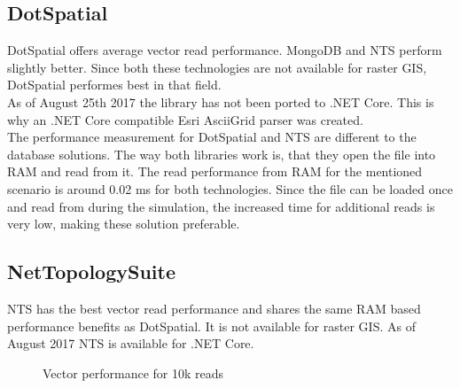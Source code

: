 \subsection{DotSpatial}
DotSpatial offers average vector read performance. MongoDB and NTS perform slightly better. Since both these technologies are not available for raster GIS, DotSpatial performes best in that field.\\
As of August 25th 2017 the library has not been ported to .NET Core. This is why an .NET Core compatible Esri AsciiGrid parser was created.\\
The performance measurement for DotSpatial and NTS are different to the database solutions. The way both libraries work is, that they open the file into RAM and read from it. The read performance from RAM for the mentioned scenario is around 0.02 ms for both technologies. Since the file can be loaded once and read from during the simulation, the increased time for additional reads is very low, making these solution preferable.

\subsection{NetTopologySuite}
NTS has the best vector read performance and shares the same RAM based performance benefits as DotSpatial. It is not available for raster GIS. As of August 2017 NTS is available for .NET Core.

\begin{figure}[H]
	\caption{Vector performance for 10k reads}
	\label{fig:vector_performace_best}
\end{figure}

